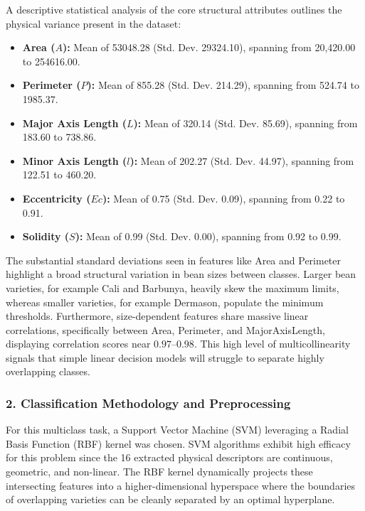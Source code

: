 \documentclass{article}
\begin{document}
A descriptive statistical analysis of the core structural attributes outlines the physical variance present in the dataset:

\begin{itemize}
    \item \textbf{Area ($A$):} Mean of 53048.28 (Std. Dev. 29324.10), spanning from 20,420.00 to 254616.00.
    \item \textbf{Perimeter ($P$):} Mean of 855.28 (Std. Dev. 214.29), spanning from 524.74 to 1985.37.
    \item \textbf{Major Axis Length ($L$):} Mean of 320.14 (Std. Dev. 85.69), spanning from 183.60 to 738.86.
    \item \textbf{Minor Axis Length ($l$):} Mean of 202.27 (Std. Dev. 44.97), spanning from 122.51 to 460.20.
    \item \textbf{Eccentricity ($Ec$):} Mean of 0.75 (Std. Dev. 0.09), spanning from 0.22 to 0.91.
    \item \textbf{Solidity ($S$):} Mean of 0.99 (Std. Dev. 0.00), spanning from 0.92 to 0.99.
\end{itemize}

The substantial standard deviations seen in features like Area and Perimeter highlight a broad structural variation in bean sizes between classes. Larger bean varieties, for example Cali and Barbunya, heavily skew the maximum limits, whereas smaller varieties, for example Dermason, populate the minimum thresholds. Furthermore, size-dependent features share massive linear correlations, specifically between Area, Perimeter, and MajorAxisLength, displaying correlation scores near $0.97$--$0.98$. This high level of multicollinearity signals that simple linear decision models will struggle to separate highly overlapping classes.

\subsubsection*{2. Classification Methodology and Preprocessing}

For this multiclass task, a Support Vector Machine (SVM) leveraging a Radial Basis Function (RBF) kernel was chosen. SVM algorithms exhibit high efficacy for this problem since the 16 extracted physical descriptors are continuous, geometric, and non-linear. The RBF kernel dynamically projects these intersecting features into a higher-dimensional hyperspace where the boundaries of overlapping varieties can be cleanly separated by an optimal hyperplane.
\end{document}
